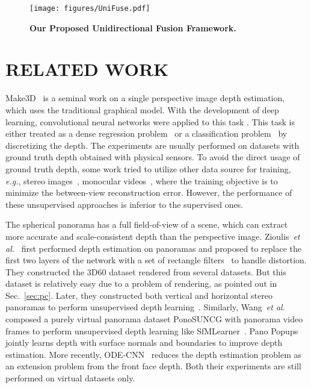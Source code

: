 \documentclass[letterpaper, 10 pt, conference]{ieeeconf}
\def\eg{\emph{e.g.}}
\def\etal{\emph{et al.}}
\begin{document}
\begin{figure*}[t]
\vspace{6pt}
\begin{center}
\texttt{[image: figures/UniFuse.pdf]}
\end{center}
\caption{\textbf{Our Proposed Unidirectional Fusion Framework.} }
\label{fig:framework}
\end{figure*}


\section{RELATED WORK}
\label{sec:rw}

Make3D~\cite{saxena2009make3d} is a seminal work on a single perspective image depth estimation, which uses the traditional graphical model.  
With the development of deep learning, convolutional neural networks were applied to this task \cite{eigen2014depth, liu2015learning, laina2016deeper, jiang2019high, fu2018deep, li2018monocular, jiang2019hierarchical}. This task is either treated as a dense regression problem~\cite{eigen2014depth, liu2015learning, laina2016deeper, jiang2019high} or a classification problem~\cite{fu2018deep, li2018monocular, jiang2019hierarchical} by discretizing the depth. The experiments are usually performed on datasets with ground truth depth obtained with physical sensors. 
To avoid the direct usage of ground truth depth, some work tried to utilize other data source for training, \eg, stereo images~\cite{garg2016unsupervised, godard2017unsupervised, godard2019digging}, monocular videos~\cite{zhou2017unsupervised, wang2019unsupervised, godard2019digging, jiang2020dipe}, where the training objective is to minimize the between-view reconstruction error. However, the performance of these unsupervised approaches is inferior to the supervised ones. 


The spherical panorama has a full field-of-view of a scene, which can extract more accurate and scale-consistent depth than the perspective image. Zioulis~\etal~\cite{zioulis2018omnidepth} first performed depth estimation on panoramas and proposed to replace the first two layers of the network with a set of rectangle filters~\cite{su2017learning} to handle distortion.
They constructed the 3D60 dataset rendered from several datasets. But this dataset is relatively easy due to a problem of rendering, as pointed out in Sec.~\ref{sec:pc}. 
Later, they constructed both vertical and horizontal stereo panoramas to perform unsupervised  depth learning~\cite{zioulis2019spherical}. Similarly, Wang~\etal~\cite{wang2018self} composed a purely virtual panorama dataset PonoSUNCG with panorama video frames to perform unsupervised depth learning like SfMLearner~\cite{zhou2017unsupervised}. 
Pano Popups~\cite{eder2019pano} jointly learns depth with surface normals and boundaries to improve depth estimation. More recently, ODE-CNN~\cite{cheng2020ode} reduces the  depth estimation problem as an extension problem from the front face depth. Both their experiments are still performed on virtual datasets only. 
\end{document}
